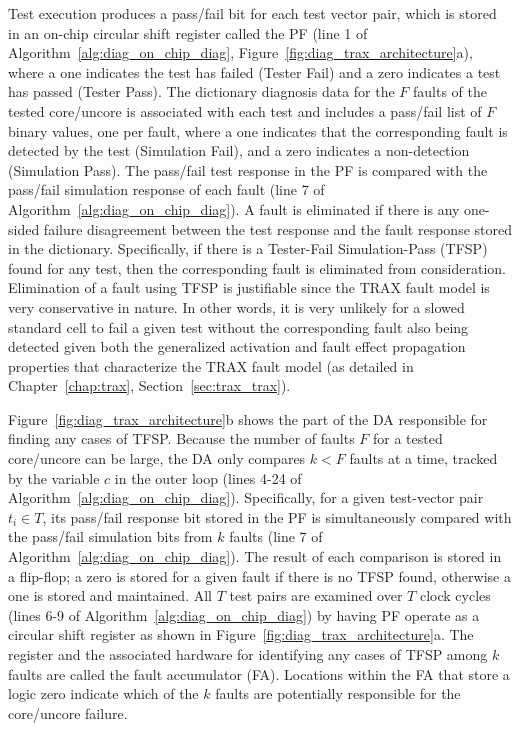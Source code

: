 Test execution produces a pass/fail bit for each test vector pair, which is stored in an on-chip circular shift register called the PF (line 1 of Algorithm~\ref{alg:diag_on_chip_diag}, Figure~\ref{fig:diag_trax_architecture}a), where a one indicates the test has failed (Tester Fail) and a zero indicates a test has passed (Tester Pass).
%
The dictionary diagnosis data for the $F$ faults of the tested core/uncore is associated with each test and includes a pass/fail list of $F$ binary values, one per fault, where a one indicates that the corresponding fault is detected by the test (Simulation Fail), and a zero indicates a non-detection (Simulation Pass).
%
The pass/fail test response in the PF is compared with the pass/fail simulation response of each fault (line 7 of Algorithm~\ref{alg:diag_on_chip_diag}).
%
A fault is eliminated if there is any one-sided failure disagreement between the test response and the fault response stored in the dictionary.
%
Specifically, if there is a Tester-Fail Simulation-Pass (TFSP) found for any test, then the corresponding fault is eliminated from consideration.
%
Elimination of a fault using TFSP is justifiable since the TRAX fault model is very conservative in nature.
%
In other words, it is very unlikely for a slowed standard cell to fail a given test without the corresponding fault also being detected given both the generalized activation and fault effect propagation properties that characterize the TRAX fault model (as detailed in Chapter~\ref{chap:trax}, Section~\ref{sec:trax_trax}).

Figure~\ref{fig:diag_trax_architecture}b shows the part of the DA responsible for finding any cases of TFSP.
%
Because the number of faults $F$ for a tested core/uncore can be large, the DA only compares $k < F$ faults at a time, tracked by the variable $c$ in the outer loop (lines 4-24 of Algorithm~\ref{alg:diag_on_chip_diag}).
%
Specifically, for a given test-vector pair $t_i \in T$, its pass/fail response bit stored in the PF is simultaneously compared with the pass/fail simulation bits from $k$ faults (line 7 of Algorithm~\ref{alg:diag_on_chip_diag}).
%
The result of each comparison is stored in a flip-flop; a zero is stored for a given fault if there is no TFSP found, otherwise a one is stored and maintained.
%
All $T$ test pairs are examined over $T$ clock cycles (lines 6-9 of Algorithm~\ref{alg:diag_on_chip_diag}) by having PF operate as a circular shift register as shown in Figure~\ref{fig:diag_trax_architecture}a.
%
The register and the associated hardware for identifying any cases of TFSP among $k$ faults are called the fault accumulator (FA).
%
Locations within the FA that store a logic zero indicate which of the $k$ faults are potentially responsible for the core/uncore failure.

